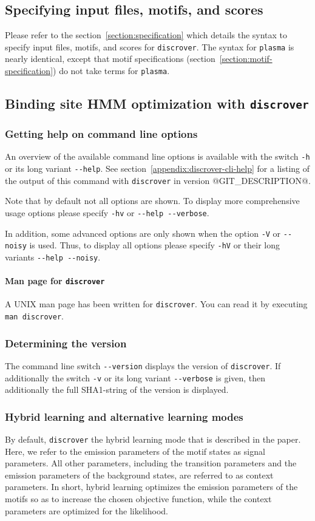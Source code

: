 \documentclass[a4paper]{article}
\makeatletter
\newcommand{\plasma}[0]{\texttt{plasma}}
\newcommand{\discrover}[0]{\texttt{discrover}}
\newcommand{\version}[0]{@GIT_DESCRIPTION@}
\makeatother
\begin{document}
\subsection{Specifying input files, motifs, and scores}
Please refer to the section~\ref{section:specification} which details the syntax to specify input files, motifs, and scores for \discrover{}.
The syntax for \plasma{} is nearly identical, except that motif specifications (section~\ref{section:motif-specification}) do not take  terms for \plasma{}.


\subsection{Binding site HMM optimization with \discrover{}}
\label{subsection:running-discrover}
\subsubsection{Getting help on command line options}
An overview of the available command line options is available with the switch \verb|-h| or its long variant \verb|--help|.
See section~\ref{appendix:discrover-cli-help} for a listing of the output of this command with \discrover{} in version \version{}.

Note that by default not all options are shown.
To display more comprehensive usage options please specify \verb|-hv| or \verb|--help --verbose|.

In addition, some advanced options are only shown when the option \verb|-V| or \verb|--noisy| is used.
Thus, to display all options please specify \verb|-hV| or their long variants \verb|--help --noisy|.

\paragraph{Man page for \discrover{}}
A UNIX man page has been written for \discrover{}.
You can read it by executing \verb|man discrover|.

\subsubsection{Determining the version}
The command line switch \verb|--version| displays the version of \discrover{}.
If additionally the switch \verb|-v| or its long variant \verb|--verbose| is given, then additionally the full SHA1-string of the version is displayed.

\subsubsection{Hybrid learning and alternative learning modes}
\label{section:hybrid-learning}
By default, \discrover{} the hybrid learning mode that is described in the paper.
Here, we refer to the emission parameters of the motif states as signal parameters.
All other parameters, including the transition parameters and the emission parameters of the background states, are referred to as context parameters.
In short, hybrid learning optimizes the emission parameters of the motifs so as to increase the chosen objective function, while the context parameters are optimized for the likelihood.
\end{document}
